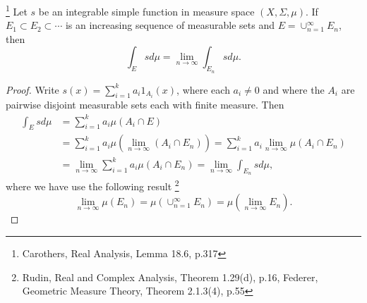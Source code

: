 \begin{lemma} \label{L:sim1}
\footnote{Carothers, Real Analysis, Lemma 18.6, p.317}
Let $s$ be an integrable simple function in measure space $(X,\Sigma,\mu)$.
If $E_1\subset E_2\subset \cdots$ is an increasing sequence of measurable
sets and $E=\cup_{n=1}^{\infty} E_n$, then
\[
  \int_E s d\mu = \lim_{n\to\infty} \int_{E_n} s d\mu.
\]
\end{lemma}
\begin{proof}
Write $s(x)=\sum_{i=1}^k a_i 1_{A_i}(x)$, where each $a_i\neq 0$ and where the 
$A_i$ are pairwise disjoint measurable sets each with finite measure. Then
\begin{align*}
  \int_E s d\mu 
     &= \sum_{i=1}^k a_i \mu(A_i\cap E)   \\
     &= \sum_{i=1}^k a_i \mu( \lim_{n\to\infty} (A_i\cap E_n) )  
      = \sum_{i=1}^k a_i \lim_{n\to\infty} \mu(A_i\cap E_n)   \\
     &= \lim_{n\to\infty} \sum_{i=1}^k a_i \mu(A_i\cap E_n) 
      = \lim_{n\to\infty} \int_{E_n} s d\mu,
\end{align*}
where we have use the following result 
\footnote{Rudin, Real and Complex Analysis, Theorem 1.29(d), p.16,
Federer, Geometric Measure Theory, Theorem 2.1.3(4), p.55}
\[
  \lim_{n\to\infty} \mu(E_n) = \mu(\cup_{n=1}^{\infty} E_n)
    = \mu( \lim_{n\to\infty} E_n ).
\]
\end{proof}

